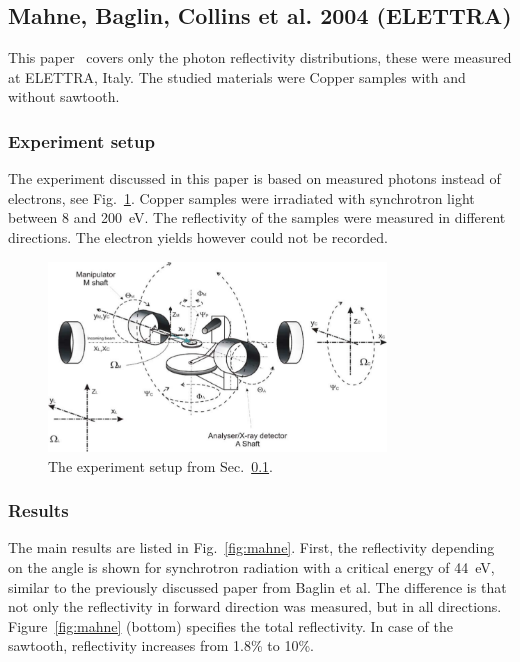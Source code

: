 
\subsection{Mahne, Baglin, Collins et al. 2004 (ELETTRA)}
\label{sec:Mahne}
This paper~\cite{mahne} covers only the photon reflectivity distributions, these were measured at ELETTRA, Italy.
The studied materials were Copper samples with and without sawtooth.

\subsubsection{Experiment setup}
The experiment discussed in this paper is based on measured photons instead of electrons, see Fig.~\ref{fig:exp_mahne}.
Copper samples were irradiated with synchrotron light between 8 and 200~eV.
The reflectivity of the samples were measured in different directions.
The electron yields however could not be recorded.

\begin{figure}[tbh]
    \centering
    \includegraphics[width=0.8\textwidth]{../ss/experiment_mahne.png}
    \caption{The experiment setup from Sec.~\ref{sec:Mahne}.}
    \label{fig:exp_mahne}
\end{figure}


\subsubsection{Results}

The main results are listed in Fig.~\ref{fig:mahne}.
First, the reflectivity depending on the angle is shown for synchrotron radiation with a critical energy of 44~eV, similar to the previously discussed paper from Baglin et al.
The difference is that not only the reflectivity in forward direction was measured, but in all directions.
Figure~\ref{fig:mahne} (bottom) specifies the total reflectivity.
In case of the sawtooth, reflectivity increases from 1.8\% to 10\%.

